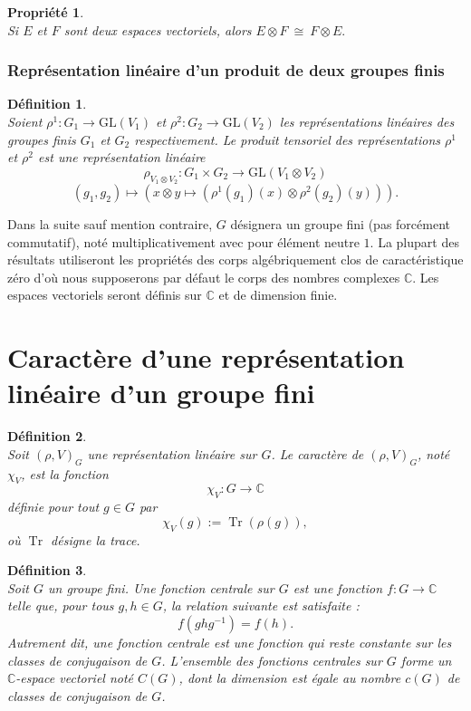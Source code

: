 \documentclass[a4paper, 14pt]{report}
\newtheorem{definition}{Définition}[section]
\newtheorem{propriety}{Propriété}[section]
\begin{document}
\begin{onehalfspace}
{			
			\begin{propriety} \cite{greub2012linear}\\
Si \(E\) et \(F\) sont deux espaces vectoriels, alors \(E \otimes F \ \cong \ F \otimes E.\)
			\end{propriety}
			
			\subsubsection{Représentation linéaire d'un produit de deux groupes finis}
			
			\begin{definition} \cite{renard2009groupes} \\
Soient \( \rho^1: G_1 \to \mathrm{GL}(V_1) \) et \( \rho^2: G_2 \to \mathrm{GL}(V_2) \) les représentations linéaires des groupes finis \( G_1 \) et \( G_2 \) respectivement. Le produit tensoriel des représentations \( \rho^1 \) et \( \rho^2 \) est une représentation linéaire 
				\[
				\rho_{V_1 \otimes V_2} : G_1 \times G_2 \to \mathrm{GL}(V_1 \otimes V_2)
				\]
				\[
				(g_1, g_2) \mapsto (x \otimes y \mapsto (\rho^1(g_1)(x) \otimes \rho^2(g_2)(y))).
				\]
			\end{definition}
			
			
Dans la suite sauf mention contraire, \( G \) désignera un groupe fini (pas forcément commutatif), noté multiplicativement avec pour élément neutre \( 1 \). La plupart des résultats utiliseront les propriétés des corps algébriquement clos de caractéristique zéro d'où nous supposerons par défaut le corps des nombres complexes $\mathbb{C}$. Les espaces vectoriels seront définis sur $\mathbb{C}$ et de dimension finie.
			
			\section{Caractère d'une représentation linéaire d'un groupe fini}
			\begin{definition} \cite{serre1971representation} \\
				Soit \( (\rho, V)_{G}\) une représentation linéaire sur \( G \). Le caractère de \( (\rho, V)_{G}\), noté \( \chi_V \), est la fonction 
				\[
				\chi_V : G \to \mathbb{C}
				\]
				définie pour tout \( g \in G \) par
				\[
				\chi_V(g) := \operatorname{Tr}(\rho(g)),
				\]
				où \( \operatorname{Tr} \) désigne la trace.
			\end{definition}

			
			\begin{definition} \cite{serre1971representation} \\
Soit $G$ un groupe fini. Une fonction centrale sur $G$ est une fonction $f : G \to \mathbb{C}$ telle que, pour tous $g, h \in G$, la relation suivante est satisfaite :
				\[
				f(ghg^{-1}) = f(h).
				\]
Autrement dit, une fonction centrale est une fonction qui reste constante sur les classes de conjugaison de $G$. L'ensemble des fonctions centrales sur $G$ forme un $\mathbb{C}$-espace vectoriel noté $C(G)$, dont la dimension est égale au nombre $c(G)$ de classes de conjugaison de $G$. 	
			\end{definition}
			
}
\end{onehalfspace}
\end{document}
